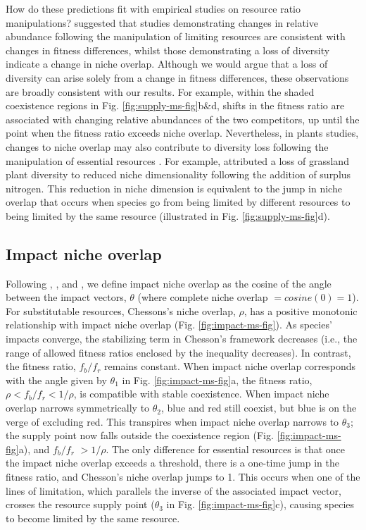 How do these predictions fit with empirical studies on resource ratio manipulations? \citet{Hillerislambers2012} suggested that studies demonstrating changes in relative abundance following the manipulation of limiting resources are consistent with changes in fitness differences, whilst those demonstrating a loss of diversity indicate a change in niche overlap. Although we would argue that a loss of diversity can arise solely from a change in fitness differences, these observations are broadly consistent with our results. For example, within the shaded coexistence regions in Fig. \ref{fig:supply-ms-fig}b\&d, shifts in the fitness ratio are associated with changing relative abundances of the two competitors, up until the point when the fitness ratio exceeds niche overlap. Nevertheless, in plants studies, changes to niche overlap may also contribute to diversity loss following the manipulation of essential resources \citep{Harpole2007, Clark2007, Hautier2009}. For example, \citet{Harpole2007} attributed a loss of grassland plant diversity to reduced niche dimensionality following the addition of surplus nitrogen. This reduction in niche dimension is equivalent to the jump in niche overlap that occurs when species go from being limited by different resources to being limited by the same resource (illustrated in Fig. \ref{fig:supply-ms-fig}d).   
\par



\subsection{Impact niche overlap}
Following \cite{Pianka1973}, \cite{Petraitis1989}, and \cite{Chase2003}, we define impact niche overlap as the cosine of the angle between the impact vectors, $\theta$ (where complete niche overlap $= cosine(0) = 1$). For substitutable resources, Chessons's niche overlap, $\rho$, has a positive monotonic relationship with impact niche overlap (Fig. \ref{fig:impact-ms-fig}). As species' impacts converge, the stabilizing term in Chesson's framework decreases (i.e., the range of allowed fitness ratios enclosed by the inequality decreases). In contrast, the fitness ratio, $f_{b}/f_{r}$ remains constant. When impact niche overlap corresponds with the angle given by $\theta_{1}$ in Fig. \ref{fig:impact-ms-fig}a, the fitness ratio, $\rho < f_{b}/f_{r} <1/\rho$, is compatible with stable coexistence. When impact niche overlap narrows symmetrically to $\theta_{2}$, blue and red still coexist, but blue is on the verge of excluding red. This transpires when impact niche overlap narrows to $\theta_{3}$; the supply point now falls outside the coexistence region (Fig. \ref{fig:impact-ms-fig}a), and $f_{b}/f_{r}$ $>1/\rho$. The only difference for essential resources is that once the  impact niche overlap exceeds a threshold, there is a one-time jump in the fitness ratio, and Chesson's niche overlap jumps to 1. This occurs when one of the lines of limitation, which parallels the inverse of the associated impact vector, crosses the resource supply point ($\theta_{3}$ in Fig. \ref{fig:impact-ms-fig}c), causing species to become limited by the same resource.
\par



